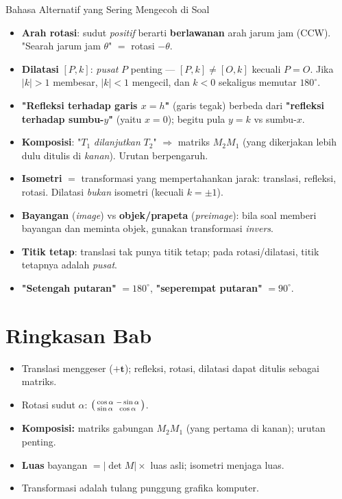 \documentclass[11pt,a4paper]{report}
\theoremstyle{gaya}
\begin{document}
\begin{konsep}{Bahasa Alternatif yang Sering Mengecoh di Soal}
\begin{itemize}[leftmargin=*,topsep=2pt]
  \item \textbf{Arah rotasi}: sudut \emph{positif} berarti \textbf{berlawanan} arah jarum jam (CCW). "Searah jarum jam $\theta$" $=$ rotasi $-\theta$.
  \item \textbf{Dilatasi} $[P,k]$: \emph{pusat} $P$ penting --- $[P,k]\neq[O,k]$ kecuali $P=O$. Jika $|k|>1$ membesar, $|k|<1$ mengecil, dan $k<0$ sekaligus memutar $180^\circ$.
  \item \textbf{"Refleksi terhadap garis $x=h$"} (garis tegak) berbeda dari \textbf{"refleksi terhadap sumbu-$y$"} (yaitu $x=0$); begitu pula $y=k$ vs sumbu-$x$.
  \item \textbf{Komposisi}: "$T_1$ \emph{dilanjutkan} $T_2$" $\Rightarrow$ matriks $M_2M_1$ (yang dikerjakan lebih dulu ditulis di \emph{kanan}). Urutan berpengaruh.
  \item \textbf{Isometri} $=$ transformasi yang mempertahankan jarak: translasi, refleksi, rotasi. Dilatasi \emph{bukan} isometri (kecuali $k=\pm1$).
  \item \textbf{Bayangan} (\emph{image}) vs \textbf{objek/prapeta} (\emph{preimage}): bila soal memberi bayangan dan meminta objek, gunakan transformasi \emph{invers}.
  \item \textbf{Titik tetap}: translasi tak punya titik tetap; pada rotasi/dilatasi, titik tetapnya adalah \emph{pusat}.
  \item \textbf{"Setengah putaran"} $=180^\circ$, \textbf{"seperempat putaran"} $=90^\circ$.
\end{itemize}
\end{konsep}

\section*{Ringkasan Bab}
\begin{itemize}[leftmargin=*,topsep=2pt]
  \item Translasi menggeser ($+\mathbf t$); refleksi, rotasi, dilatasi dapat ditulis sebagai matriks.
  \item Rotasi sudut $\alpha$: $\begin{psmallmatrix}\cos\alpha&-\sin\alpha\\ \sin\alpha&\cos\alpha\end{psmallmatrix}$.
  \item \textbf{Komposisi:} matriks gabungan $M_2M_1$ (yang pertama di kanan); urutan penting.
  \item \textbf{Luas} bayangan $=|\det M|\times$ luas asli; isometri menjaga luas.
  \item Transformasi adalah tulang punggung grafika komputer.
\end{itemize}
\end{document}
